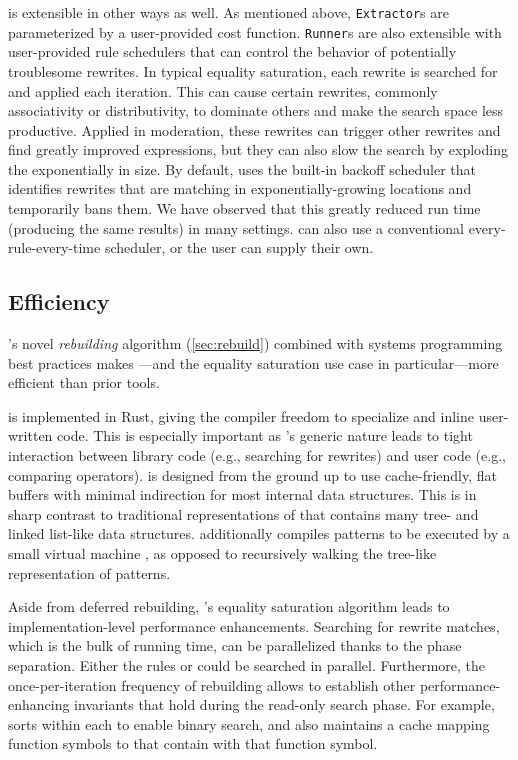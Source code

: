 \egg is extensible in other ways as well.
As mentioned above, \texttt{Extractor}s are parameterized by a user-provided
  cost function.
\texttt{Runner}s are also extensible with user-provided rule schedulers that can
  control the behavior of potentially troublesome rewrites.
\label{sec:rule-scheduling}
In typical equality saturation, each rewrite is searched for and applied each
  iteration.
This can cause certain rewrites, commonly associativity or distributivity,
  to dominate others and make the search space less productive.
Applied in moderation, these rewrites can trigger other rewrites and find
  greatly improved expressions,
  but they can also slow the search by
  exploding the \egraph exponentially in size.
By default, \egg uses the built-in backoff scheduler
  that identifies rewrites that are matching in exponentially-growing
  locations and temporarily bans them.
We have observed that this greatly reduced run time (producing the same results)
  in many settings.
\egg can also use a conventional every-rule-every-time scheduler, or the user
  can supply their own.

\subsection{Efficiency}
\label{sec:egg-efficient}

\egg's novel \textit{rebuilding} algorithm (\autoref{sec:rebuild})
combined with systems programming best practices
  makes \egraphs---and the equality saturation
  use case in particular---more efficient than prior tools.

\egg is implemented in Rust, giving the compiler freedom to
  specialize and inline user-written code.
This is especially important as
  \egg's generic nature leads to tight interaction
  between library code
  (e.g., searching for rewrites) and user code (e.g., comparing operators).
\egg is designed from the ground up to use cache-friendly,
  flat buffers with minimal indirection for most internal data structures.
This is in sharp contrast to traditional representations of \egraphs
  \cite{nelson, simplify} that contains many tree- and linked list-like data
  structures.
\egg additionally compiles patterns to be executed by a small virtual machine
  \cite{ematching}, as opposed to recursively walking the tree-like
  representation of patterns.

Aside from deferred rebuilding, \egg's equality saturation algorithm leads to
  implementation-level performance enhancements.
Searching for rewrite matches, which is the bulk of running time, can be
  parallelized thanks to the phase separation.
Either the rules or \eclasses could be searched in parallel.
Furthermore, the once-per-iteration frequency of rebuilding allows \egg to
  establish other performance-enhancing invariants that hold during the
  read-only search phase.
For example, \egg sorts \enodes within each \eclass to enable binary search, and
  also maintains a cache mapping function symbols to \eclasses that
  contain \enodes with that function symbol.

